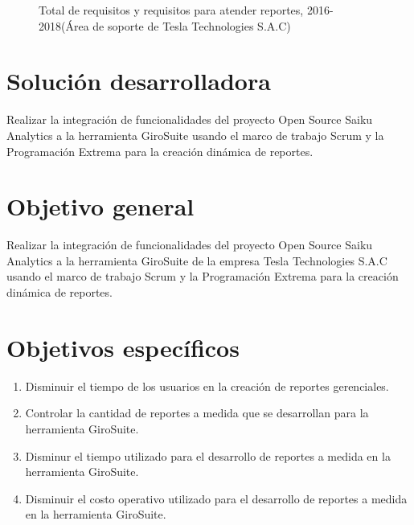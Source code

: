 \begin{spacing}{1.5}
	\begin{figure}[H]
		\begin{center}
			\tikzI
		\end{center}
		\caption {\centering \small{Total de requisitos y requisitos para atender reportes,  2016-2018(\'{A}rea de soporte de Tesla Technologies S.A.C)}} \label{figure:chaperI_1}
	\end{figure}
	
\end{spacing}

\clearpage
\section{Soluci\'{o}n desarrolladora}
\begin{spacing}{1.5}
	Realizar la integraci\'{o}n de funcionalidades del proyecto Open Source Saiku Analytics a la herramienta GiroSuite usando el marco de trabajo Scrum y la Programaci\'{o}n Extrema para la creaci\'{o}n din\'{a}mica de reportes.
\end{spacing}
\section{Objetivo general}
\begin{spacing}{1.5}
	Realizar la integraci\'{o}n de funcionalidades del proyecto Open Source Saiku Analytics a la herramienta GiroSuite de la empresa Tesla Technologies S.A.C usando el marco de trabajo Scrum y la Programaci\'{o}n Extrema para la creaci\'{o}n din\'{a}mica de reportes.
\end{spacing}
\section{Objetivos espec\'{i}ficos}
\begin{spacing}{1.5}
	\begin{enumerate}[label=\alph*)]
		\item Disminuir el tiempo de los usuarios en la creaci\'{o}n de reportes gerenciales.
		\item Controlar la cantidad de reportes a medida que se desarrollan para la herramienta GiroSuite.
		\item Disminur el tiempo utilizado para el desarrollo de reportes a medida en la herramienta GiroSuite.
		\item Disminuir el costo operativo utilizado para el desarrollo de reportes a medida en la herramienta GiroSuite.
	\end{enumerate}	
\end{spacing}


	
